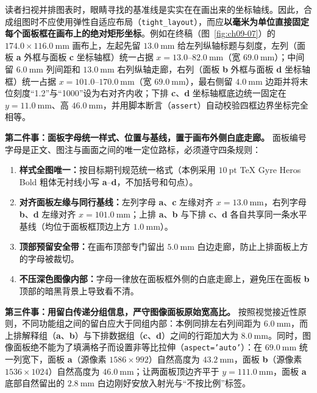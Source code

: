 读者扫视并排图表时，眼睛寻找的基准线是实实在在画出来的坐标轴线。因此，合成组图时不应使用弹性自适应布局（\texttt{tight\_layout}），而应\textbf{以毫米为单位直接固定每个面板框在画布上的绝对矩形坐标}。例如在终稿（图~\ref{fig:ch09-07}）的 $174.0 \times 116.0\ \text{mm}$ 画布上，左起先留 $13.0\ \text{mm}$ 给左列纵轴标题与刻度，左列（面板 \textbf{a} 外框与面板 \textbf{c} 坐标轴框）统一占据 $x = 13.0\text{--}82.0\ \text{mm}$（宽 $69.0\ \text{mm}$）；中间留 $6.0\ \text{mm}$ 列间距和 $13.0\ \text{mm}$ 右列纵轴走廊，右列（面板 \textbf{b} 外框与面板 \textbf{d} 坐标轴框）统一占据 $x = 101.0\text{--}170.0\ \text{mm}$（宽 $69.0\ \text{mm}$），最右侧留 $4.0\ \text{mm}$ 边距并将末位刻度“1.2”与“1000”设为右对齐内收；下排 \textbf{c}、\textbf{d} 坐标轴框底边统一固定在 $y = 11.0\ \text{mm}$、高 $46.0\ \text{mm}$，并用脚本断言（\texttt{assert}）自动校验四框边界坐标完全相等。

\textbf{第二件事：面板字母统一样式、位置与基线，置于画布外侧白底走廊。}
面板编号字母是正文、图注与画面之间的唯一定位路标，必须遵守四条规则：
\begin{enumerate}
\item \textbf{样式全图唯一：}按目标期刊规范统一格式（本例采用 $10\ \text{pt}$ TeX Gyre Heros Bold 粗体无衬线小写 \textbf{a}–\textbf{d}，不加括号和句点）。
\item \textbf{对齐面板左缘与同行基线：}左列字母 \textbf{a}、\textbf{c} 左缘对齐 $x = 13.0\ \text{mm}$，右列字母 \textbf{b}、\textbf{d} 左缘对齐 $x = 101.0\ \text{mm}$；上排 \textbf{a}、\textbf{b} 与下排 \textbf{c}、\textbf{d} 各自共享同一条水平基线（均位于面板框顶边上方 $1.0\ \text{mm}$）。
\item \textbf{顶部预留安全带：}在画布顶部专门留出 $5.0\ \text{mm}$ 白边走廊，防止上排面板上方的字母被裁切。
\item \textbf{不压深色图像内部：}字母一律放在面板框外侧的白底走廊上，避免压在面板 \textbf{b} 顶部的暗黑背景上导致看不清。
\end{enumerate}

\textbf{第三件事：用留白传递分组信息，严守图像面板原始宽高比。}
按照视觉接近性原则，不同功能组之间的留白应大于同组内部：本例同排左右列间距为 $6.0\ \text{mm}$，而上排解释组（\textbf{a}、\textbf{b}）与下排数据组（\textbf{c}、\textbf{d}）之间的行距加大为 $8.0\ \text{mm}$。同时，图像面板绝不能为了填满格子而设置非等比拉伸（\texttt{aspect='auto'}）：在 $69.0\ \text{mm}$ 统一列宽下，面板 \textbf{a}（源像素 $1586 \times 992$）自然高度为 $43.2\ \text{mm}$，面板 \textbf{b}（源像素 $1536 \times 1024$）自然高度为 $46.0\ \text{mm}$；让两面板顶边齐平于 $y = 111.0\ \text{mm}$，面板 \textbf{a} 底部自然留出的 $2.8\ \text{mm}$ 白边刚好安放入射光与“不按比例”标签。

